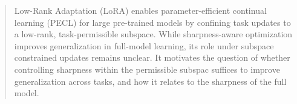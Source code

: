 \documentclass{article}
\theoremstyle{plain}
\theoremstyle{definition}
\theoremstyle{remark}
\begin{document}

\printAffiliationsAndNotice{}  %

\begin{abstract}
Low-Rank Adaptation (LoRA) enables parameter-efficient continual learning (PECL) for large pre-trained models by confining task updates to a low-rank, task-permissible subspace.
While sharpness-aware optimization improves generalization in full-model learning, its role under subspace constrained updates remains unclear.
It motivates the question of whether controlling sharpness within the permissible subspac suffices to improve generalization across tasks, and how it relates to the sharpness of the full model.

\end{abstract}
\end{document}
